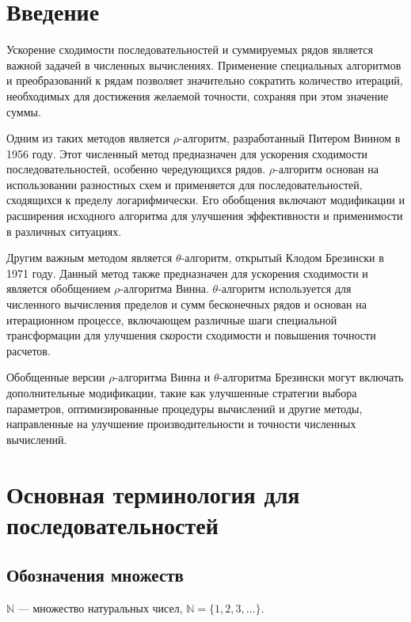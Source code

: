 \documentclass[14pt, a4paper]{extarticle}
\theoremstyle{definition}
\theoremstyle{remark}
\begin{document}
\tableofcontents
\clearpage

\setcounter{page}{2} %

\section{Введение}


Ускорение сходимости последовательностей и суммируемых рядов является
важной задачей в численных вычислениях. Применение специальных
алгоритмов и преобразований к рядам позволяет значительно сократить
количество итераций, необходимых для достижения желаемой точности,
сохраняя при этом значение суммы.

Одним из таких методов является $\rho$-алгоритм, разработанный Питером Винном
в 1956 году. Этот численный метод предназначен для ускорения сходимости
последовательностей, особенно чередующихся рядов. $\rho$-алгоритм основан на
использовании разностных схем и применяется для последовательностей,
сходящихся к пределу логарифмически. Его обобщения включают модификации
и расширения исходного алгоритма для улучшения эффективности и
применимости в различных ситуациях.

Другим важным методом является $\theta$-алгоритм, открытый Клодом Брезински в
1971 году. Данный метод также предназначен для ускорения сходимости и
является обобщением $\rho$-алгоритма Винна. $\theta$-алгоритм используется для
численного вычисления пределов и сумм бесконечных рядов и основан на
итерационном процессе, включающем различные шаги специальной
трансформации для улучшения скорости сходимости и повышения точности
расчетов.

Обобщенные версии $\rho$-алгоритма Винна и $\theta$-алгоритма Брезински могут
включать дополнительные модификации, такие как улучшенные стратегии
выбора параметров, оптимизированные процедуры вычислений и другие
методы, направленные на улучшение производительности и точности
численных вычислений.

\section{Основная терминология для последовательностей}

\subsection*{Обозначения множеств}
\(\mathbb{N}\) — множество натуральных чисел, \(\mathbb{N}=\{1,2,3,\dots\}\).
\end{document}
